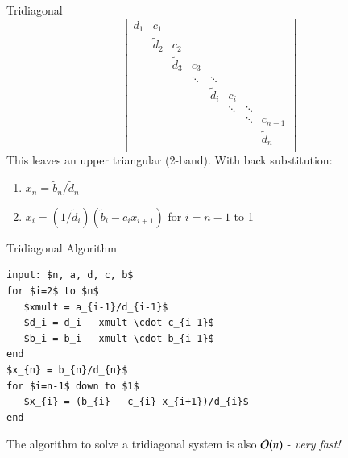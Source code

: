 \documentclass[10pt]{beamer}
\begin{document}
\begin{frame}{Tridiagonal}
\begin{equation*}
  \begin{bmatrix}
{d}_1 & c_1 &       &         &       &       &          &    \\
 & {\tilde{d}}_2 & c_2   &         &       &       &          &    \\
    & & {\tilde{d}}_3   & c_3     &       &       &          &    \\
    &     &  & \ddots   & \ddots &       &          &    \\
    &     &       &  & {\tilde{d}}_i   & c_{i} &          &    \\
    &     &       &         & & \ddots & \ddots    &    \\
    &     &       &         & & & \ddots    &  c_{n-1}  \\
    &     &       &         &       &       & & {\tilde{d}}_n   \\
  \end{bmatrix}
\end{equation*}
This leaves an upper triangular (2-band).  With back substitution:
\begin{enumerate}
  \item $x_n = {\tilde{b}}_n/{\tilde{d}}_n$
  \item $x_{i} = (1/{\tilde{d}}_{i})({\tilde{b}}_{i} - c_{i}x_{i+1})$ for $i = n-1$ to 1
\end{enumerate}
\end{frame}

\begin{frame}[fragile]{Tridiagonal Algorithm}
\begin{lstlisting}[mathescape,caption=Thomas Algorithm]
input: $n, a, d, c, b$
for $i=2$ to $n$
   $xmult = a_{i-1}/d_{i-1}$
   $d_i = d_i - xmult \cdot c_{i-1}$
   $b_i = b_i - xmult \cdot b_{i-1}$
end
$x_{n} = b_{n}/d_{n}$
for $i=n-1$ down to $1$
   $x_{i} = (b_{i} - c_{i} x_{i+1})/d_{i}$
end
\end{lstlisting}

\vspace{4mm}

The algorithm to solve a tridiagonal system is also ${\mathcal{O}}(n)$ - \emph{very fast!}

\end{frame}

\end{document}
